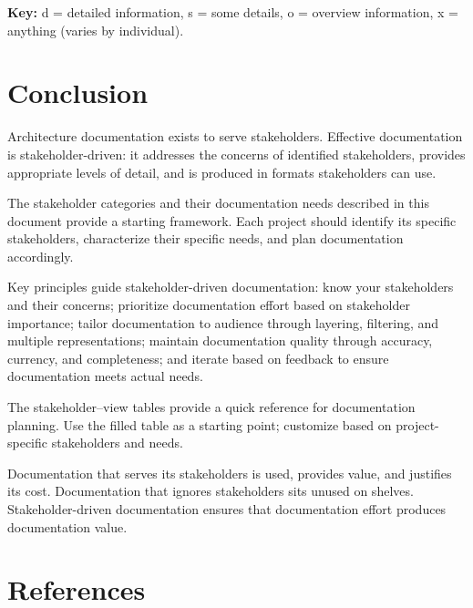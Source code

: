 \documentclass[11pt]{article}
\begin{document}
\begin{landscape}
\vspace{1em}
\noindent\textbf{Key:} d = detailed information, s = some details, o = overview information, x = anything (varies by individual).
\end{landscape}

\clearpage
\section{Conclusion}

Architecture documentation exists to serve stakeholders. Effective documentation is stakeholder-driven: it addresses the concerns of identified stakeholders, provides appropriate levels of detail, and is produced in formats stakeholders can use.

The stakeholder categories and their documentation needs described in this document provide a starting framework. Each project should identify its specific stakeholders, characterize their specific needs, and plan documentation accordingly.

Key principles guide stakeholder-driven documentation: know your stakeholders and their concerns; prioritize documentation effort based on stakeholder importance; tailor documentation to audience through layering, filtering, and multiple representations; maintain documentation quality through accuracy, currency, and completeness; and iterate based on feedback to ensure documentation meets actual needs.

The stakeholder--view tables provide a quick reference for documentation planning. Use the filled table as a starting point; customize based on project-specific stakeholders and needs.

Documentation that serves its stakeholders is used, provides value, and justifies its cost. Documentation that ignores stakeholders sits unused on shelves. Stakeholder-driven documentation ensures that documentation effort produces documentation value.

\section*{References}
\end{document}
